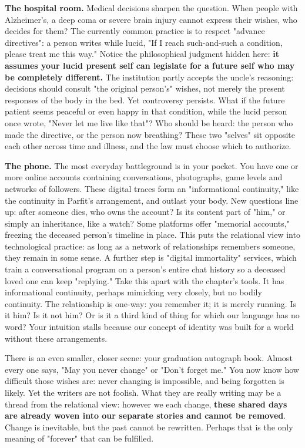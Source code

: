 \textbf{The hospital room.} Medical decisions sharpen the question. When people with Alzheimer's, a deep coma or severe brain injury cannot express their wishes, who decides for them? The currently common practice is to respect "advance directives": a person writes while lucid, "If I reach such-and-such a condition, please treat me this way." Notice the philosophical judgment hidden here: \textbf{it assumes your lucid present self can legislate for a future self who may be completely different.} The institution partly accepts the uncle's reasoning: decisions should consult "the original person's" wishes, not merely the present responses of the body in the bed. Yet controversy persists. What if the future patient seems peaceful or even happy in that condition, while the lucid person once wrote, "Never let me live like that"? Who should be heard: the person who made the directive, or the person now breathing? These two "selves" sit opposite each other across time and illness, and the law must choose which to authorize.

\textbf{The phone.} The most everyday battleground is in your pocket. You have one or more online accounts containing conversations, photographs, game levels and networks of followers. These digital traces form an "informational continuity," like the continuity in Parfit's arrangement, and outlast your body. New questions line up: after someone dies, who owns the account? Is its content part of "him," or simply an inheritance, like a watch? Some platforms offer "memorial accounts," freezing the deceased person's timeline in place. This puts the relational view into technological practice: as long as a network of relationships remembers someone, they remain in some sense. A further step is "digital immortality" services, which train a conversational program on a person's entire chat history so a deceased loved one can keep "replying." Take this apart with the chapter's tools. It has informational continuity, perhaps mimicking very closely, but no bodily continuity. The relationship is one-way: you remember it; it is merely running. Is it him? Is it not him? Or is it a third kind of thing for which our language has no word? Your intuition stalls because our concept of identity was built for a world without these arrangements.

There is an even smaller, closer scene: your graduation autograph book. Almost every one says, "May you never change" or "Don't forget me." You now know how difficult those wishes are: never changing is impossible, and being forgotten is likely. Yet the writers are not foolish. What they are really writing may be a thread from the relational view: however we each change, \textbf{these shared days are already woven into our separate stories and cannot be removed}. Change is inevitable, but the past cannot be rewritten. Perhaps that is the only meaning of "forever" that can be fulfilled.


